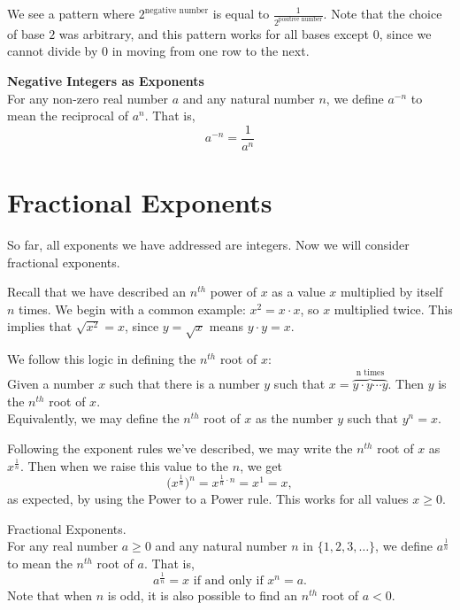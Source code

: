 \documentclass{ximera}
\begin{document}
  We see a pattern where $2^{\text{negative number}}$ is equal to $\frac{1}{2^{\text{positive number}}}$.
      Note that the choice of base $2$ was arbitrary,
      and this pattern works for all bases except $0$,
      since we cannot divide by $0$ in moving from one row to the next.

\begin{callout}
    \textbf{ \Large  Negative Integers as Exponents}\\
          For any non-zero real number $a$ and any natural number $n$,
          we define $a^{-n}$ to mean the reciprocal of $a^n$. That is,
$$      
 a^{-n} = \frac{1}{a^n}
   $$
     
    \end{callout}
    
    \section{Fractional Exponents}
    
    So far, all exponents we have addressed are integers. Now we will consider fractional exponents. 
        
    Recall that we have described an $n^{th}$ power of $x$ as a value $x$ multiplied by itself $n$ times.
    We begin with a common example: $x^2 = x \cdot x$, so $x$ multiplied twice. This implies that $\sqrt{x^2} = x$, since $y=\sqrt{x}$ means $y \cdot y=x$.
    
    We follow this logic in defining the $n^{th}$ root of $x$:\\
    Given a number $x$ such that there is a number $y$ such that  $x=\overbrace{y\cdot y\cdots y}^{\text{n times}}$. Then $y$ is the $n^{th}$ root of $x$. \\
    Equivalently, we may define the $n^{th}$ root of $x$ as the number $y$ such that $y^n=x$.
   
   Following the exponent rules we've described, we may write the $n^{th}$ root of $x$ as $x^{\frac{1}{n}}$. Then when we raise this value to the $n$, we get
    $$\big(x^{\frac{1}{n}}\big)^n=x^{\frac{1}{n}\cdot n} = x^1 = x,$$
    as expected, by using the Power to a Power rule. This works for all values $x \geq 0$.
    
    \begin{definition}
    Fractional Exponents.\\
          For any real number $a \geq 0$ and any natural number $n$ in $\{1,2,3,\dots\}$,
          we define $a^{\frac{1}{n}}$ to mean the $n^{th}$ root of $a$. That is,
$$      
 a^{\frac{1}{n}} = x \text{ if and only if } x^n = a.
   $$
     Note that when $n$ is odd, it is also possible to find an $n^{th}$ root of $a<0$.
    \end{definition}
\end{document}
